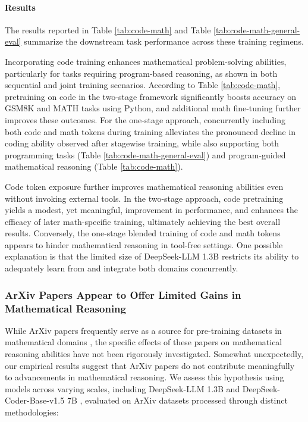 \paragraph{Results}
The results reported in Table \ref{tab:code-math} and Table \ref{tab:code-math-general-eval} summarize the downstream task performance across these training regimens.

Incorporating code training enhances mathematical problem-solving abilities, particularly for tasks requiring program-based reasoning, as shown in both sequential and joint training scenarios. According to Table \ref{tab:code-math}, pretraining on code in the two-stage framework significantly boosts accuracy on GSM8K and MATH tasks using Python, and additional math fine-tuning further improves these outcomes. For the one-stage approach, concurrently including both code and math tokens during training alleviates the pronounced decline in coding ability observed after stagewise training, while also supporting both programming tasks (Table \ref{tab:code-math-general-eval}) and program-guided mathematical reasoning (Table \ref{tab:code-math}).

Code token exposure further improves mathematical reasoning abilities even without invoking external tools. In the two-stage approach, code pretraining yields a modest, yet meaningful, improvement in performance, and enhances the efficacy of later math-specific training, ultimately achieving the best overall results. Conversely, the one-stage blended training of code and math tokens appears to hinder mathematical reasoning in tool-free settings. One possible explanation is that the limited size of DeepSeek-LLM 1.3B restricts its ability to adequately learn from and integrate both domains concurrently.

\subsubsection{ArXiv Papers Appear to Offer Limited Gains in Mathematical Reasoning}

While ArXiv papers frequently serve as a source for pre-training datasets in mathematical domains \citep{minerva,gpt-f,llemma,mathpile}, the specific effects of these papers on mathematical reasoning abilities have not been rigorously investigated. Somewhat unexpectedly, our empirical results suggest that ArXiv papers do not contribute meaningfully to advancements in mathematical reasoning. We assess this hypothesis using models across varying scales, including DeepSeek-LLM 1.3B and DeepSeek-Coder-Base-v1.5 7B \citep{deepseek-coder}, evaluated on ArXiv datasets processed through distinct methodologies:

